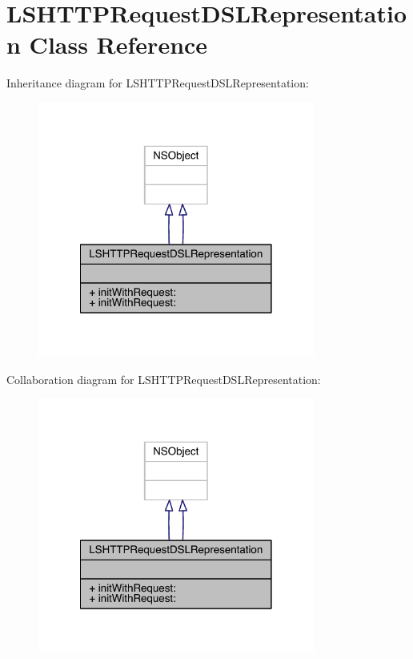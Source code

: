 \hypertarget{interface_l_s_h_t_t_p_request_d_s_l_representation}{\section{L\-S\-H\-T\-T\-P\-Request\-D\-S\-L\-Representation Class Reference}
\label{interface_l_s_h_t_t_p_request_d_s_l_representation}
}


Inheritance diagram for L\-S\-H\-T\-T\-P\-Request\-D\-S\-L\-Representation\-:\nopagebreak
\begin{figure}[H]
\begin{center}
\leavevmode
\includegraphics[width=258pt]{interface_l_s_h_t_t_p_request_d_s_l_representation__inherit__graph}
\end{center}
\end{figure}


Collaboration diagram for L\-S\-H\-T\-T\-P\-Request\-D\-S\-L\-Representation\-:\nopagebreak
\begin{figure}[H]
\begin{center}
\leavevmode
\includegraphics[width=258pt]{interface_l_s_h_t_t_p_request_d_s_l_representation__coll__graph}
\end{center}
\end{figure}

